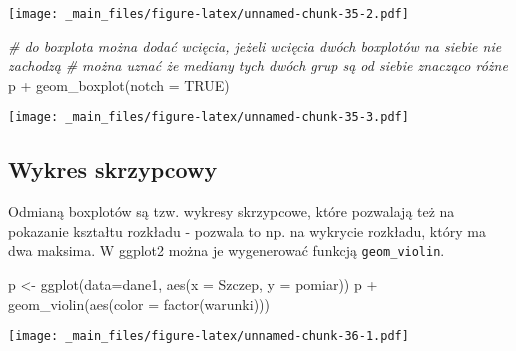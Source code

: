 \documentclass[
]{book}
\newenvironment{Shaded}{\begin{snugshade}}{\end{snugshade}}
\newcommand{\AttributeTok}[1]{\textcolor[rgb]{0.77,0.63,0.00}{#1}}
\newcommand{\CommentTok}[1]{\textcolor[rgb]{0.56,0.35,0.01}{\textit{#1}}}
\newcommand{\ConstantTok}[1]{\textcolor[rgb]{0.00,0.00,0.00}{#1}}
\newcommand{\FunctionTok}[1]{\textcolor[rgb]{0.00,0.00,0.00}{#1}}
\newcommand{\NormalTok}[1]{#1}
\newcommand{\OtherTok}[1]{\textcolor[rgb]{0.56,0.35,0.01}{#1}}
\newcommand{\SpecialCharTok}[1]{\textcolor[rgb]{0.00,0.00,0.00}{#1}}
\begin{document}
\texttt{[image: \_main\_files/figure-latex/unnamed-chunk-35-2.pdf]}

\begin{Shaded}
\begin{Highlighting}[]
\CommentTok{\# do boxplota można dodać wcięcia, jeżeli wcięcia dwóch boxplotów na siebie nie zachodzą }
\CommentTok{\# można uznać że mediany tych dwóch grup są od siebie znacząco różne}
\NormalTok{p }\SpecialCharTok{+} \FunctionTok{geom\_boxplot}\NormalTok{(}\AttributeTok{notch =} \ConstantTok{TRUE}\NormalTok{)}
\end{Highlighting}
\end{Shaded}

\texttt{[image: \_main\_files/figure-latex/unnamed-chunk-35-3.pdf]}

\hypertarget{wykres-skrzypcowy}{%
\subsection{Wykres skrzypcowy}\label{wykres-skrzypcowy}}

Odmianą boxplotów są tzw. wykresy skrzypcowe, które pozwalają też na pokazanie kształtu rozkładu - pozwala to np. na wykrycie rozkładu, który ma dwa maksima. W ggplot2 można je wygenerować funkcją \texttt{geom\_violin}.

\begin{Shaded}
\begin{Highlighting}[]
\NormalTok{p }\OtherTok{\textless{}{-}} \FunctionTok{ggplot}\NormalTok{(}\AttributeTok{data=}\NormalTok{dane1, }\FunctionTok{aes}\NormalTok{(}\AttributeTok{x =}\NormalTok{ Szczep, }\AttributeTok{y =}\NormalTok{ pomiar))}
\NormalTok{p }\SpecialCharTok{+} \FunctionTok{geom\_violin}\NormalTok{(}\FunctionTok{aes}\NormalTok{(}\AttributeTok{color =} \FunctionTok{factor}\NormalTok{(warunki)))}
\end{Highlighting}
\end{Shaded}

\texttt{[image: \_main\_files/figure-latex/unnamed-chunk-36-1.pdf]}
\end{document}
